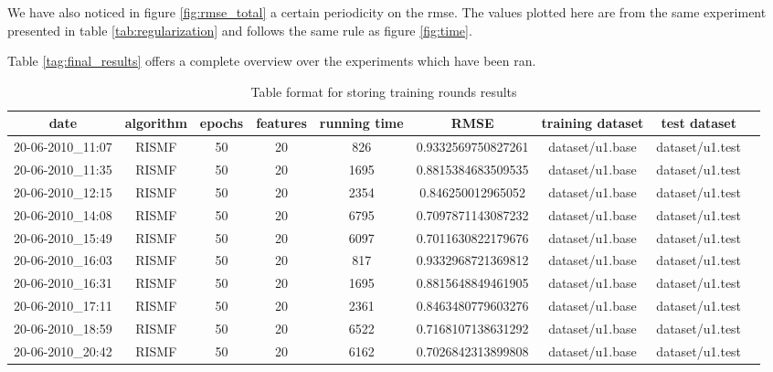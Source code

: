 \documentclass[10pt,a4paper]{article}  %
\begin{document}
We have also noticed in figure \ref{fig:rmse_total} a certain periodicity on the rmse. The values plotted here are from the same experiment presented in table \ref{tab:regularization} and follows the same rule as figure \ref{fig:time}.


Table \ref{tag:final_results} offers a complete overview over the experiments which have been ran. 

  \begin{table}[ht]%
    \caption{Table format for storing training rounds results}
    \label{table:sqlite3_schema}\centering%
    \small\addtolength{\tabcolsep}{-5pt}
    \begin{tabular}{ccccccccc}
    \toprule%
    date & algorithm & epochs & features & running time & RMSE & training dataset   & test dataset    \\ \toprule
    20-06-2010\_11:07 & RISMF & 50 & 20 & 826 & 0.9332569750827261 & dataset/u1.base & dataset/u1.test \\
    20-06-2010\_11:35 & RISMF & 50 & 20 & 1695 & 0.8815384683509535 & dataset/u1.base & dataset/u1.test\\
    20-06-2010\_12:15 & RISMF & 50 & 20 & 2354 & 0.846250012965052 & dataset/u1.base & dataset/u1.test \\
    20-06-2010\_14:08 & RISMF & 50 & 20 & 6795 & 0.7097871143087232 & dataset/u1.base & dataset/u1.test\\
    20-06-2010\_15:49 & RISMF & 50 & 20 & 6097 & 0.7011630822179676 & dataset/u1.base & dataset/u1.test\\
    20-06-2010\_16:03 & RISMF & 50 & 20 & 817 & 0.9332968721369812 & dataset/u1.base & dataset/u1.test \\
    20-06-2010\_16:31 & RISMF & 50 & 20 & 1695 & 0.8815648849461905 & dataset/u1.base & dataset/u1.test\\
    20-06-2010\_17:11 & RISMF & 50 & 20 & 2361 & 0.8463480779603276 & dataset/u1.base & dataset/u1.test\\
    20-06-2010\_18:59 & RISMF & 50 & 20 & 6522 & 0.7168107138631292 & dataset/u1.base & dataset/u1.test\\
    20-06-2010\_20:42 & RISMF & 50 & 20 & 6162 & 0.7026842313899808 & dataset/u1.base & dataset/u1.test\\

\end{tabular}
\end{table}
\end{document}

